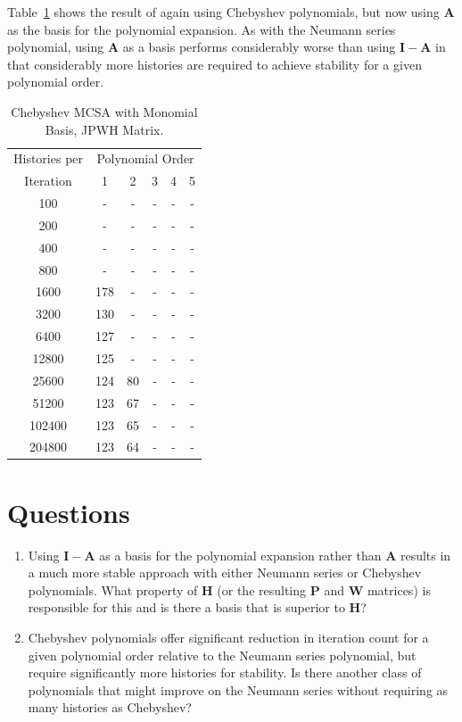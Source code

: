 \documentclass[10pt]{article}
\newcommand{\bA}{\ensuremath{\mathbf{A}}}
\newcommand{\bH}{\ensuremath{\mathbf{H}}}
\newcommand{\bP}{\ensuremath{\mathbf{P}}}
\newcommand{\bW}{\ensuremath{\mathbf{W}}}
\newcommand{\bI}{\ensuremath{\mathbf{I}}}
\begin{document}
Table~\ref{tab:jpwh_cheby_power} shows the result of
again using Chebyshev polynomials, but now using
$\bA$ as the basis for the polynomial expansion.
As with the Neumann series polynomial, using
$\bA$ as a basis performs considerably worse than
using $\bI - \bA$ in that considerably more histories
are required to achieve stability for a given polynomial
order.
\begin{table}
\caption{Chebyshev MCSA with Monomial Basis, JPWH Matrix. 
\label{tab:jpwh_cheby_power}}
\centering
\begin{tabular}{cccccc}
 \toprule
 Histories per & \multicolumn{5}{c}{Polynomial Order} \\
 Iteration & 1 & 2 & 3 & 4 & 5 \\
 \midrule
 100 & - & - & - & - & - \\
 200 & - & - & - & - & - \\
 400 & - & - & - & - & - \\
 800 & - & - & - & - & - \\
 1600 & 178 & - & - & - & - \\
 3200 & 130 & - & - & - & - \\
 6400 & 127 & - & - & - & - \\
 12800 & 125 & - & - & - & - \\
 25600 & 124 & 80 & - & - & - \\
 51200 & 123 & 67 & - & - & - \\
 102400 & 123 & 65 & - & - & - \\
 204800 & 123 & 64 & - & - & - \\
\bottomrule
\end{tabular}
\end{table}

\section{Questions}

\begin{enumerate}

\item Using $\bI - \bA$ as a basis for the polynomial expansion rather
than $\bA$ results in a much more stable approach with either
Neumann series or Chebyshev polynomials.  What property of $\bH$
(or the resulting $\bP$ and $\bW$ matrices) is responsible for this
and is there a basis that is superior to $\bH$?

\item Chebyshev polynomials offer significant reduction in iteration
count for a given polynomial order relative to the Neumann series polynomial, 
but require significantly more
histories for stability.  Is there another class of polynomials that
might improve on the Neumann series without requiring as many
histories as Chebyshev?
\end{enumerate}



\end{document}
